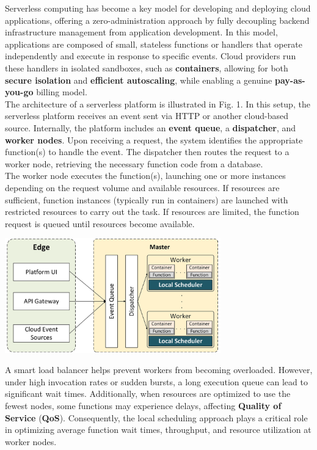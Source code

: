 Serverless computing has become a key model for developing and deploying cloud applications, offering a zero-administration approach by fully decoupling backend infrastructure management from application development. In this model, applications are composed of small, stateless functions or handlers that operate independently and execute in response to specific events. Cloud providers run these handlers in isolated sandboxes, such as \textbf{containers}, allowing for both \textbf{secure isolation} and \textbf{efficient autoscaling}, while enabling a genuine \textbf{pay-as-you-go} billing model.\vspace{14pt}\\
The architecture of a serverless platform is illustrated in Fig. 1. In this setup, the serverless platform receives an event sent via HTTP or another cloud-based source. Internally, the platform includes an \textbf{event queue}, a \textbf{dispatcher}, and \textbf{worker nodes}. Upon receiving a request, the system identifies the appropriate function(s) to handle the event. The dispatcher then routes the request to a worker node, retrieving the necessary function code from a database.\vspace{14pt}\\
The worker node executes the function(s), launching one or more instances depending on the request volume and available resources. If resources are sufficient, function instances (typically run in containers) are launched with restricted resources to carry out the task. If resources are limited, the function request is queued until resources become available.\vspace{10pt}\\
\begin{center}
    \includegraphics[width=0.7\textwidth]{img/arch.png}
    \vspace{10pt}
\end{center}
A smart load balancer helps prevent workers from becoming overloaded. However, under high invocation rates or sudden bursts, a long execution queue can lead to significant wait times. Additionally, when resources are optimized to use the fewest nodes, some functions may experience delays, affecting \textbf{Quality of Service} (\textbf{QoS}). Consequently, the local scheduling approach plays a critical role in optimizing average function wait times, throughput, and resource utilization at worker nodes.\vspace{14pt}\\

